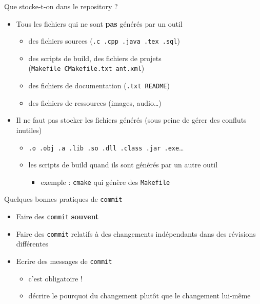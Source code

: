\begin{frame}[fragile]{%
\protect\hypertarget{que-stocke-t-on-dans-le-repository}{%
Que stocke-t-on dans le repository ?}}

\begin{itemize}
\tightlist
\item
  Tous les fichiers qui ne sont \textbf{pas} générés par un outil

  \begin{itemize}
  \tightlist
  \item
    des fichiers sources (\texttt{.c\ .cpp\ .java\ .tex\ .sql})
  \item
    des scripts de build, des fichiers de projets
    (\texttt{Makefile\ CMakefile.txt\ ant.xml})
  \item
    des fichiers de documentation (\texttt{.txt\ README})
  \item
    des fichiers de ressources (images, audio\ldots{})
  \end{itemize}
\item
  Il ne faut pas stocker les fichiers générés (sous peine de gérer des
  confluts inutiles)

  \begin{itemize}
  \tightlist
  \item
    \texttt{.o\ .obj\ .a\ .lib\ .so\ .dll\ .class\ .jar\ .exe}\ldots{}
  \item
    les scripts de build quand ils sont générés par un autre outil

    \begin{itemize}
    \tightlist
    \item
      exemple : \texttt{cmake} qui génère des \texttt{Makefile}
    \end{itemize}
  \end{itemize}
\end{itemize}

\end{frame}

\begin{frame}[fragile]{%
\protect\hypertarget{quelques-bonnes-pratiques-de-commit}{%
Quelques bonnes pratiques de \texttt{commit}}}

\begin{itemize}
\tightlist
\item
  Faire des \texttt{commit} \textbf{souvent}
\item
  Faire des \texttt{commit} relatifs à des changements indépendants dans
  des révisions différentes
\item
  Ecrire des messages de \texttt{commit}

  \begin{itemize}
  \tightlist
  \item
    c’est obligatoire !
  \item
    décrire le pourquoi du changement plutôt que le changement lui-même
  \end{itemize}
\end{itemize}

\end{frame}

